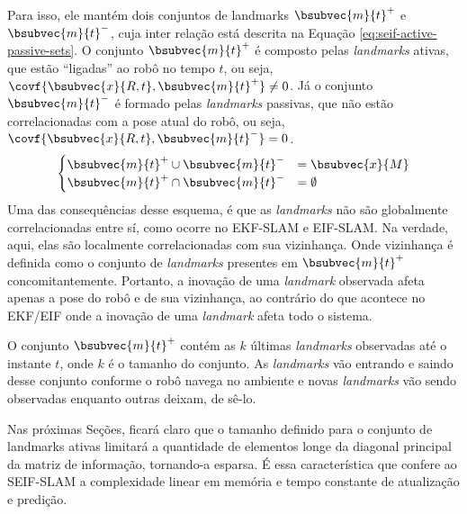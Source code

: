 Para isso, ele mantém dois conjuntos de landmarks $\bsubvec{m}{t}^+$ e $\bsubvec{m}{t}^-$, cuja inter relação está descrita na Equação \ref{eq:seif-active-passive-sets}. O conjunto $\bsubvec{m}{t}^+$ é composto pelas \textit{landmarks} ativas, que estão
``ligadas'' ao robô no tempo $t$, ou seja, 
$\covf{\bsubvec{x}{R, t}, \bsubvec{m}{t}^+} \neq 0$. Já o conjunto 
$\bsubvec{m}{t}^-$ é 
formado pelas \textit{landmarks} passivas, que não estão correlacionadas com 
a pose atual do robô, ou seja, 
$\covf{\bsubvec{x}{R, t}, \bsubvec{m}{t}^-} = 0$.
\begin{equation}
\begin{cases}
  \bsubvec{m}{t}^+ \cup \bsubvec{m}{t}^- &= \bsubvec{x}{M} \\
  \bsubvec{m}{t}^+ \cap \bsubvec{m}{t}^- &= \emptyset
\end{cases}
\label{eq:seif-active-passive-sets}
\end{equation}
Uma das consequências desse esquema, é que as \textit{landmarks} não são 
globalmente correlacionadas entre sí, como ocorre no EKF-SLAM e EIF-SLAM. Na 
verdade, aqui, elas são localmente correlacionadas com sua vizinhança. Onde 
vizinhança é definida como o conjunto de \textit{landmarks} presentes em 
$\bsubvec{m}{t}^+$ concomitantemente. Portanto, a inovação de uma 
\textit{landmark} observada afeta apenas a pose do robô e de sua vizinhança, 
ao contrário do que acontece no EKF/EIF onde a inovação de uma 
\textit{landmark} afeta todo o sistema.

O conjunto $\bsubvec{m}{t}^+$ contém as $k$ últimas \textit{landmarks} 
observadas até o instante $t$, onde $k$ é o tamanho do conjunto. As 
\textit{landmarks} vão entrando e saindo desse conjunto conforme o robô 
navega no ambiente e novas \textit{landmarks} vão sendo observadas enquanto 
outras deixam, de sê-lo.

Nas próximas Seções, ficará claro que o tamanho definido para o conjunto de 
landmarks ativas limitará a quantidade de elementos longe da diagonal 
principal da matriz de informação, tornando-a esparsa. É essa 
característica que confere ao SEIF-SLAM a complexidade linear em memória e 
tempo constante de atualização e predição.

